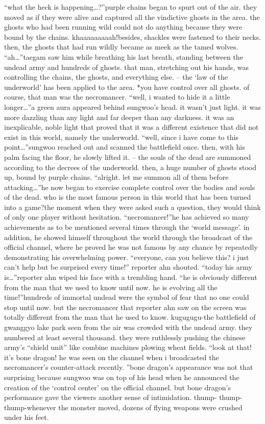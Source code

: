 “what the heck is happening…?”purple chains began to spurt out of the air.
 they moved as if they were alive and captured all the vindictive ghosts in the area.
 the ghosts who had been running wild could not do anything because they were bound by the chains.
khaaaaaaaaah!besides, shackles were fastened to their necks.
 then, the ghosts that had run wildly became as meek as the tamed wolves.
“ah…”taegam saw him while breathing his last breath, standing between the undead army and hundreds of ghosts.
 that man, stretching out his hands, was controlling the chains, the ghosts, and everything else.
– the ‘law of the underworld’ has been applied to the area.
*you have control over all ghosts.
of course, that man was the necromancer.
“well, i wanted to hide it a little longer…”a green aura appeared behind sungwoo’s head.
 it wasn’t just light.
 it was more dazzling than any light and far deeper than any darkness.
 it was an inexplicable, noble light that proved that it was a different existence that did not exist in this world, namely the underworld.
“well, since i have come to this point…”sungwoo reached out and scanned the battlefield once.
 then, with his palm facing the floor, he slowly lifted it.
– the souls of the dead are summoned according to the decrees of the underworld.
then, a huge number of ghosts stood up, bound by purple chains.
“alright.
 let me summon all of them before attacking…”he now began to exercise complete control over the bodies and souls of the dead.
who is the most famous person in this world that has been turned into a game?the moment when they were asked such a question, they would think of only one player without hesitation.
“necromancer!”he has achieved so many achievements as to be mentioned several times through the ‘world message’.
 in addition, he showed himself throughout the world through the broadcast of the official channel, where he proved he was not famous by any chance by repeatedly demonstrating his overwhelming power.
“everyone, can you believe this? i just can’t help but be surprised every time!” reporter ahn shouted.
“today his army is…”reporter ahn wiped his face with a trembling hand.
“he is obviously different from the man that we used to know until now.
 he is evolving all the time!”hundreds of immortal undead were the symbol of fear that no one could stop until now.
but the necromancer that reporter ahn saw on the screen was totally different from the man that he used to know.
kugugugu-the battlefield of gwanggyo lake park seen from the air was crowded with the undead army.
 they numbered at least several thousand.
 they were ruthlessly pushing the chinese army’s “shield unit” like combine machines plowing wheat fields.
“look at that! it’s bone dragon! he was seen on the channel when i broadcasted the necromancer’s counter-attack recently.
”bone dragon’s appearance was not that surprising because sungwoo was on top of his head when he announced the creation of the ‘control center’ on the official channel.
but bone dragon’s performance gave the viewers another sense of intimidation.
thump- thump- thump-whenever the monster moved, dozens of flying weapons were crushed under his feet.


